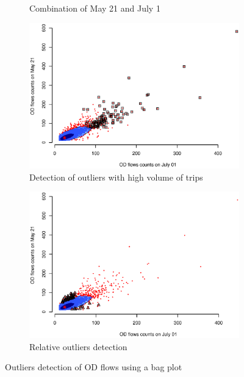 \documentclass[a4paper,UKenglish]{lipics-v2018}
\begin{document}
\begin{figure}
\begin{subfigure}[b]{0.49\textwidth}
	\caption{Combination of May 21 and July 1}
	\label{fig:OD_0721_0521}
	\end{subfigure}
    \hfill
	\begin{subfigure}[b]{0.49\textwidth}
	\includegraphics[width=\textwidth]{images/Outliers_high_0701_0521.eps}
	\caption{Detection of outliers with high volume of trips}
	\label{fig:OD_outliers_high}
    \end{subfigure}
	\begin{subfigure}[b]{0.53\textwidth}
	\includegraphics[width=\textwidth]{images/Outliers_rare_0701_0521.eps}
	\caption{Relative outliers detection}
	\label{fig:OD_outliers_rare}
    \end{subfigure}
	\caption{Outliers detection of OD flows using a bag plot}\label{fig:bagplot_0521_0701}	
\end{figure}
\end{document}
